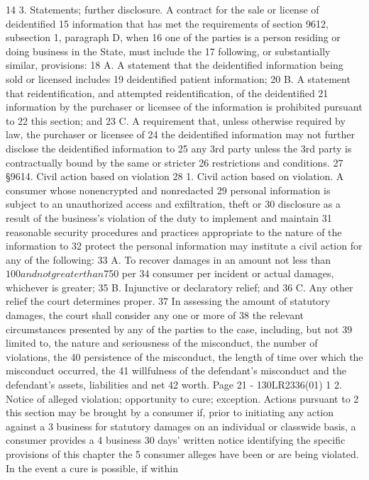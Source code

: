14 3. Statements; further disclosure. A contract for the sale or license of deidentified
15 information that has met the requirements of section 9612, subsection 1, paragraph D, when
16 one of the parties is a person residing or doing business in the State, must include the
17 following, or substantially similar, provisions:
18 A. A statement that the deidentified information being sold or licensed includes
19 deidentified patient information;
20 B. A statement that reidentification, and attempted reidentification, of the deidentified
21 information by the purchaser or licensee of the information is prohibited pursuant to
22 this section; and
23 C. A requirement that, unless otherwise required by law, the purchaser or licensee of
24 the deidentified information may not further disclose the deidentified information to
25 any 3rd party unless the 3rd party is contractually bound by the same or stricter
26 restrictions and conditions.
27 §9614. Civil action based on violation
28 1. Civil action based on violation. A consumer whose nonencrypted and nonredacted
29 personal information is subject to an unauthorized access and exfiltration, theft or
30 disclosure as a result of the business's violation of the duty to implement and maintain
31 reasonable security procedures and practices appropriate to the nature of the information to
32 protect the personal information may institute a civil action for any of the following:
33 A. To recover damages in an amount not less than $100 and not greater than $750 per
34 consumer per incident or actual damages, whichever is greater;
35 B. Injunctive or declaratory relief; and
36 C. Any other relief the court determines proper.
37 In assessing the amount of statutory damages, the court shall consider any one or more of
38 the relevant circumstances presented by any of the parties to the case, including, but not
39 limited to, the nature and seriousness of the misconduct, the number of violations, the
40 persistence of the misconduct, the length of time over which the misconduct occurred, the
41 willfulness of the defendant's misconduct and the defendant's assets, liabilities and net
42 worth.
Page 21 - 130LR2336(01)
1 2. Notice of alleged violation; opportunity to cure; exception. Actions pursuant to
2 this section may be brought by a consumer if, prior to initiating any action against a
3 business for statutory damages on an individual or classwide basis, a consumer provides a
4 business 30 days' written notice identifying the specific provisions of this chapter the
5 consumer alleges have been or are being violated. In the event a cure is possible, if within
